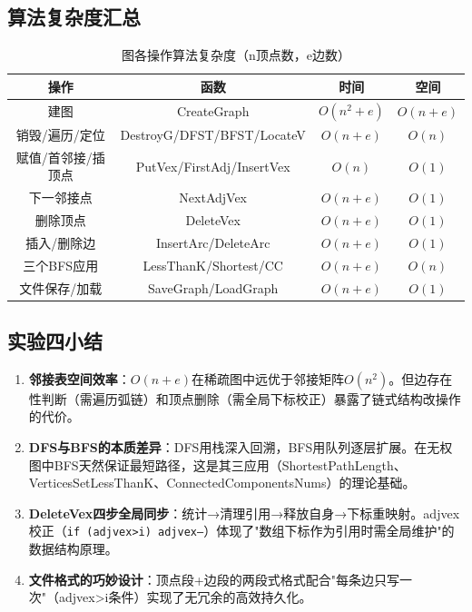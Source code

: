 \documentclass[supercite]{Experimental_Report}
\begin{document}
{\subsection{算法复杂度汇总}

\begin{table}[H]\centering
\caption{图各操作算法复杂度（n顶点数，e边数）}
\label{tbl:complexity2}\renewcommand\arraystretch{1.2}
\begin{tabular}{|c|c|c|c|}\hline
\textbf{操作} & \textbf{函数} & \textbf{时间} & \textbf{空间} \\\hline
建图 & CreateGraph & $O(n^2+e)$ & $O(n+e)$ \\\hline
销毁/遍历/定位 & DestroyG/DFST/BFST/LocateV & $O(n+e)$ & $O(n)$ \\\hline
赋值/首邻接/插顶点 & PutVex/FirstAdj/InsertVex & $O(n)$ & $O(1)$ \\\hline
下一邻接点 & NextAdjVex & $O(n+e)$ & $O(1)$ \\\hline
删除顶点 & DeleteVex & $O(n+e)$ & $O(1)$ \\\hline
插入/删除边 & InsertArc/DeleteArc & $O(n+e)$ & $O(1)$ \\\hline
三个BFS应用 & LessThanK/Shortest/CC & $O(n+e)$ & $O(n)$ \\\hline
文件保存/加载 & SaveGraph/LoadGraph & $O(n+e)$ & $O(1)$ \\\hline
\end{tabular}
\end{table}

\subsection{实验四小结}

\begin{enumerate}
    \item \textbf{邻接表空间效率}：$O(n+e)$在稀疏图中远优于邻接矩阵$O(n^2)$。但边存在性判断（需遍历弧链）和顶点删除（需全局下标校正）暴露了链式结构改操作的代价。
    \item \textbf{DFS与BFS的本质差异}：DFS用栈深入回溯，BFS用队列逐层扩展。在无权图中BFS天然保证最短路径，这是其三应用（ShortestPathLength、VerticesSetLessThanK、ConnectedComponentsNums）的理论基础。
    \item \textbf{DeleteVex四步全局同步}：统计→清理引用→释放自身→下标重映射。adjvex校正（\texttt{if (adjvex>i) adjvex--}）体现了"数组下标作为引用时需全局维护"的数据结构原理。
    \item \textbf{文件格式的巧妙设计}：顶点段+边段的两段式格式配合"每条边只写一次"（adjvex>i条件）实现了无冗余的高效持久化。
\end{enumerate}

}
\end{document}
